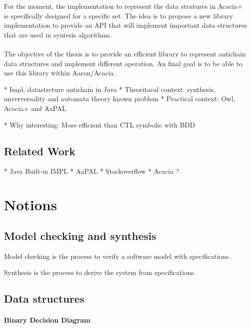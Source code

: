 \documentclass[letterpaper]{memoir}
\begin{document}
For the moment, the implementation to represent the data strutures in
 Acacia+
is specifically designed for a specific set. The idea is to propose a new
library implementation to provide an API that will implement important
data structures that are used in syntesis algorithms.

\paragraph{}

The objective of the thesis is to provide an efficient library to represent
antichain data structures and implement different operation. An final
goal is to be able to use this library within Aaron/Acacia.


* Impl. datastrcture antichain in Java
* Theoritacal context: synthesis,
unverversality and automata theory known problem
* Practical context: Owl, Acacia+ and AaPAL

* Why interesting: More efficient than CTL symbolic with BDD

\subsection{Related Work}

* Java Built-in IMPL
* AaPAL
* Stackoverflow
* Acacia ?

\section{Notions}

\subsection{Model checking and synthesis}

Model checking is the process to verify a software model with
specifications.

Synthesis is the process to derive the system from specifications.

\cite{bohyphd}

\cite{ltl_rea}
\subsection{Data structures}

\paragraph{Binary Decision Diagram}
\end{document}
